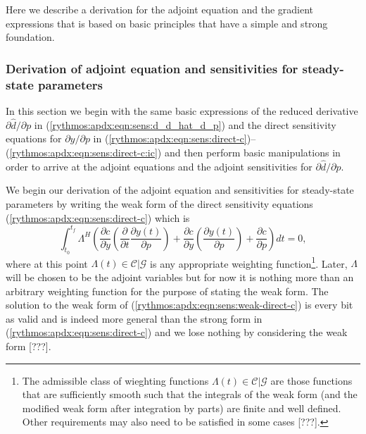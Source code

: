 \documentclass[pdf,ps2pdf,11pt]{SANDreport}
\begin{document}
Here we describe a derivation for the adjoint equation and the gradient
expressions that is based on basic principles that have a simple and strong
foundation.

\subsubsection{Derivation of adjoint equation and sensitivities for steady-state parameters}
\label{rythmos:app:adj-equ-derivation}

In this section we begin with the same basic expressions of the reduced
derivative ${}\partial {}\hat{d} / {}\partial p$ in
(\ref{rythmos:apdx:eqn:sens:d_d_hat_d_p}) and the direct sensitivity equations
for ${}\partial y / {}\partial p$ in
(\ref{rythmos:apdx:eqn:sens:direct-c})--(\ref{rythmos:apdx:eqn:sens:direct-c:ic})
and then perform basic manipulations in order to arrive at the adjoint
equations and the adjoint sensitivities for ${}\partial {}\hat{d} /
{}\partial p$.

We begin our derivation of the adjoint equation and sensitivities for
steady-state parameters by writing the weak form of the direct sensitivity
equations (\ref{rythmos:apdx:eqn:sens:direct-c}) which is
%
\begin{equation}
\int_{t_0}^{t_f} \Lambda^H \left(
\frac{\partial c}{\partial \dot{y}} \left(\frac{\partial}{\partial t} \frac{\partial y(t)}{\partial p} \right)
+ \frac{\partial c}{\partial y} \left(\frac{\partial y(t)}{\partial p}\right)
+ \frac{\partial c}{\partial p}
\right) dt = 0,
\label{rythmos:apdx:eqn:sens:weak-direct-c}
\end{equation}
%
where at this point $\Lambda(t)\in\mathcal{C}|\mathcal{G}$ is any
appropriate weighting function\footnote{The admissible class of
wieghting functions $\Lambda(t)\in\mathcal{C}|\mathcal{G}$ are those
functions that are sufficiently smooth such that the integrals of the
weak form (and the modified weak form after integration by parts) are
finite and well defined.  Other requirements may also need to be
satisfied in some cases [???].}.  Later, $\Lambda$ will be chosen to
be the adjoint variables but for now it is nothing more than an
arbitrary weighting function for the purpose of stating the weak form.
The solution to the weak form of
(\ref{rythmos:apdx:eqn:sens:weak-direct-c}) is every bit as valid and
is indeed more general than the strong form in
(\ref{rythmos:apdx:eqn:sens:direct-c}) and we lose nothing by
considering the weak form [???].
\end{document}
